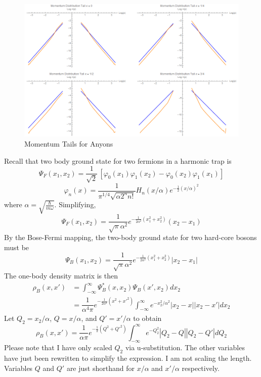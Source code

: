 \documentclass[onecolumn,english,aps,pra]{revtex4}
\begin{document}
\begin{center}
\begin{figure}[h]
	\includegraphics[scale=.45]{"Plots/FullMomentumTails"}
	\caption{Momentum Tails for Anyons}
	\label{fig:tails}
\end{figure}
\end{center}

Recall that two body ground state for two fermions in a harmonic trap is
\[ \Psi_F(x_1,x_2) = \frac{1}{\sqrt{2}} \,\left[ \varphi_0(x_1) \varphi_1(x_2) -\varphi_0(x_2) \varphi_1(x_1) \right]  \]
\[ \varphi_{n}(x) = \dfrac{1}{\pi^{1/4} \sqrt{\alpha 2^n n!}} H_{n}(x/\alpha) e^{-\frac{1}{2}(x/\alpha)^2} \]
where $\alpha = \sqrt{\frac{\hbar}{m \omega}}$. Simplifying, 
\[ \Psi_{F}(x_{1},x_{2}) = \dfrac{1}{\sqrt{\pi} \alpha^2} e^{-\frac{1}{2\alpha^2} (x_{1}^2 + x_{2}^2)} (x_{2} - x_{1}) \]
By the Bose-Fermi mapping, the two-body ground state for two hard-core bosons must be 
\[ \Psi_{B}(x_{1},x_{2}) = \dfrac{1}{\sqrt{\pi} \alpha^2} e^{-\frac{1}{2\alpha^2} (x_{1}^2 + x_{2}^2)} |x_{2} - x_{1}|  \]
The one-body density matrix is then
\begin{align*}
\rho_{B}(x, x') &= \int_{-\infty}^{\infty} \Psi_{B}^{*}(x ,x_{2}) \Psi_{B}(x' ,x_{2}) dx_{2}\\
& = \dfrac{1}{\alpha^4 \pi} e^{-\frac{1}{2\alpha^2} (x^2 + x'^2)} \int_{-\infty}^{\infty} e^{-x_{2}^{2}/\alpha^2} |x_{2} - x| |x_{2} - x'| dx_{2}
\end{align*}
Let $Q_{2} = x_{2}/\alpha$, $Q = x/\alpha$, and $Q' = x'/\alpha$ to obtain
\begin{equation}
\rho_{B}(x, x') = \dfrac{1}{\alpha \pi} e^{-\frac{1}{2} (Q^2 + Q'^2)} \int_{-\infty}^{\infty} e^{-Q_{2}^{2}} |Q_{2} - Q| |Q_{2} - Q'| dQ_{2}
\end{equation}
Please note that I have only scaled $Q_{2}$ via u-substitution. The other variables have just been rewritten to simplify the expression. I am not scaling the length. Variables $Q$ and $Q'$ are just shorthand for $ x/\alpha$ and $x'/\alpha$ respectively.
\end{document}
